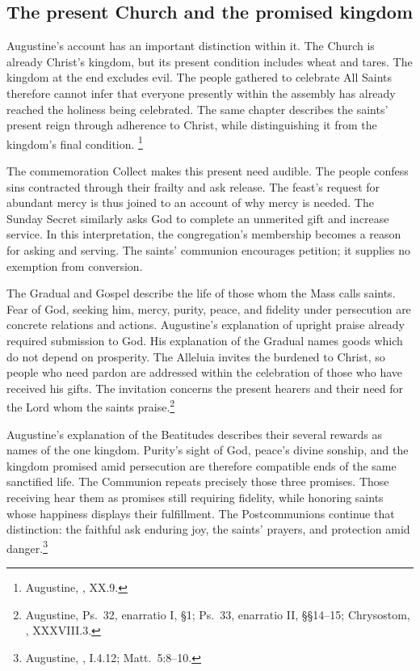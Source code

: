 \subsection{The present Church and the promised kingdom}
Augustine's account has an important distinction within it. The Church is
already Christ's kingdom, but its present condition includes wheat and
tares. The kingdom at the end excludes evil. The people gathered to
celebrate All Saints therefore cannot infer that everyone presently
within the assembly has already reached the holiness being celebrated.
The same chapter describes the saints' present reign through adherence to
Christ, while distinguishing it from the kingdom's final condition.
\footnote{Augustine, , XX.9.}

The commemoration Collect makes this present need audible. The people
confess sins contracted through their frailty and ask release. The
feast's request for abundant mercy is thus joined to an account of why
mercy is needed. The Sunday Secret similarly asks God to complete an
unmerited gift and increase service. In this interpretation, the
congregation's membership becomes a reason for asking and serving.
The saints' communion encourages petition; it supplies no exemption
from conversion.

The Gradual and Gospel describe the life of those whom the Mass calls
saints. Fear of God, seeking him, mercy, purity, peace, and fidelity under
persecution are concrete relations and actions. Augustine's explanation
of upright praise already required submission to God. His explanation of
the Gradual names goods which do not depend on prosperity. The
Alleluia invites the burdened to Christ, so people who need pardon are
addressed within the celebration of those who have received his gifts.
The invitation concerns the present hearers and their need for the
Lord whom the saints praise.\footnote{Augustine, Ps.~32, enarratio I,
\S1; Ps.~33, enarratio II, \S\S14--15;
Chrysostom, , XXXVIII.3.}

Augustine's explanation of the Beatitudes describes their several rewards
as names of the one kingdom. Purity's sight of God, peace's divine sonship,
and the kingdom promised amid persecution are therefore compatible ends of
the same sanctified life. The Communion repeats precisely those three
promises. Those receiving hear them as promises still requiring fidelity,
while honoring saints whose happiness displays their fulfillment.
The Postcommunions continue that distinction: the faithful ask enduring
joy, the saints' prayers, and protection amid danger.\footnote{Augustine,
, I.4.12; Matt.~5:8--10.}

